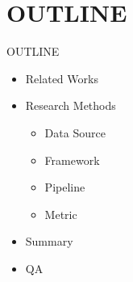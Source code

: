 \section{OUTLINE}
\begin{frame}{OUTLINE}
  \begin{itemize}
    \item Related Works
    \item Research Methods
    \begin{itemize}
      \item Data Source
      \item Framework
      \item Pipeline
      \item Metric
    \end{itemize}
    \item Summary
    \item QA
  \end{itemize}
\end{frame}
